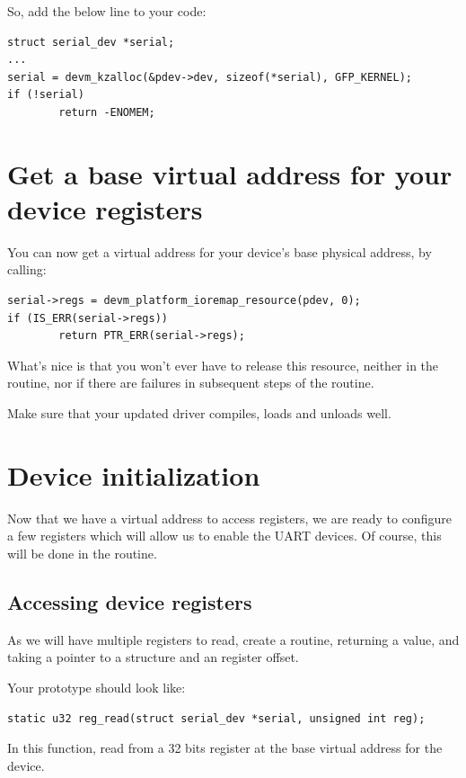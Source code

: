 So, add the below line to your code:

\begin{verbatim}
struct serial_dev *serial;
...
serial = devm_kzalloc(&pdev->dev, sizeof(*serial), GFP_KERNEL);
if (!serial)
        return -ENOMEM;
\end{verbatim}

\section{Get a base virtual address for your device registers}

You can now get a virtual address for your device's base physical
address, by calling:

\begin{verbatim}
serial->regs = devm_platform_ioremap_resource(pdev, 0);
if (IS_ERR(serial->regs))
        return PTR_ERR(serial->regs);
\end{verbatim}

What's nice is that you won't ever have to release this resource,
neither in the  routine, nor if there are failures
in subsequent steps of the  routine.

Make sure that your updated driver compiles, loads and unloads well.

\section{Device initialization}

Now that we have a virtual address to access registers, we are ready to
configure a few registers which will allow us to enable the UART
devices. Of course, this will be done in the  routine.

\subsection{Accessing device registers}

As we will have multiple registers to read, create a 
routine, returning a  value, and taking a 
pointer to a  structure and an 
register offset.

Your prototype should look like:
\begin{verbatim}
static u32 reg_read(struct serial_dev *serial, unsigned int reg);
\end{verbatim}

In this function, read from a 32 bits register at the base virtual
address for the device.

